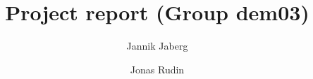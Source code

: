 \title{Project report (Group dem03)} %
\author{Jannik Jaberg \and Jonas Rudin} %

\institute{\lectureInstitute} %
\begin{report}






\newpage





\end{report}


